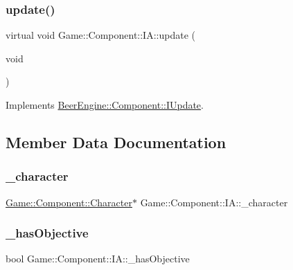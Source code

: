 \subsubsection{\texorpdfstring{update()}{update()}}
{\footnotesize\ttfamily virtual void Game\+::\+Component\+::\+I\+A\+::update (\begin{DoxyParamCaption}\item[{void}]{ }\end{DoxyParamCaption})\hspace{0.3cm}{\ttfamily [virtual]}}



Implements \mbox{\hyperlink{class_beer_engine_1_1_component_1_1_i_update_aeeda0aa303175720e449b4c51d9867dd}{Beer\+Engine\+::\+Component\+::\+I\+Update}}.



\subsection{Member Data Documentation}
\mbox{\label{class_game_1_1_component_1_1_i_a_a83ff83411f922e5b2e0e6befcea81151}} 
\subsubsection{\texorpdfstring{\+\_\+character}{\_character}}
{\footnotesize\ttfamily \mbox{\hyperlink{class_game_1_1_component_1_1_character}{Game\+::\+Component\+::\+Character}}$\ast$ Game\+::\+Component\+::\+I\+A\+::\+\_\+character\hspace{0.3cm}{\ttfamily [protected]}}

\mbox{\label{class_game_1_1_component_1_1_i_a_a90be59b613c01737c0c1ca64dc873585}} 
\subsubsection{\texorpdfstring{\+\_\+has\+Objective}{\_hasObjective}}
{\footnotesize\ttfamily bool Game\+::\+Component\+::\+I\+A\+::\+\_\+has\+Objective\hspace{0.3cm}{\ttfamily [protected]}}

